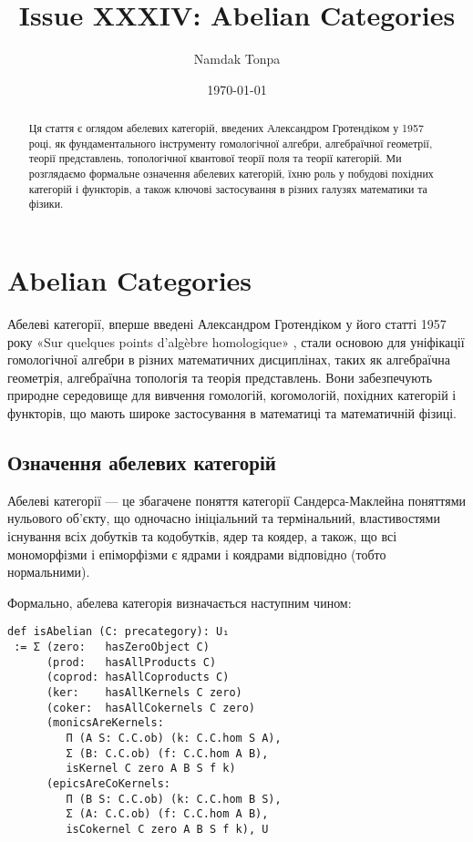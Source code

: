 \documentclass[12pt]{article}
\begin{document}
\title{Issue XXXIV: Abelian Categories}
\author{Namdak Tonpa}
\date{\today}

\maketitle

\begin{abstract}
Ця стаття є оглядом абелевих категорій, введених Александром Гротендіком у 1957 році, як фундаментального інструменту гомологічної алгебри, алгебраїчної геометрії, теорії представлень, топологічної квантової теорії поля та теорії категорій. Ми розглядаємо формальне означення абелевих категорій, їхню роль у побудові похідних категорій і функторів, а також ключові застосування в різних галузях математики та фізики.
\end{abstract}


\ifincludeTOC
  \tableofcontents
\fi

\section{Abelian Categories}
Абелеві категорії, вперше введені Александром Гротендіком у його статті 1957 року «Sur quelques points d'algèbre homologique» \cite{Grothendieck57}, стали основою для уніфікації гомологічної алгебри в різних математичних дисциплінах, таких як алгебраїчна геометрія, алгебраїчна топологія та теорія представлень. Вони забезпечують природне середовище для вивчення гомологій, когомологій, похідних категорій і функторів, що мають широке застосування в математиці та математичній фізиці.

\subsection{Означення абелевих категорій}
Абелеві категорії — це збагачене поняття категорії Сандерса-Маклейна поняттями нульового об’єкту, що одночасно ініціальний та термінальний, властивостями існування всіх добутків та кодобутків, ядер та коядер, а також, що всі мономорфізми і епіморфізми є ядрами і коядрами відповідно (тобто нормальними).

Формально, абелева категорія визначається наступним чином:

\begin{lstlisting}
def isAbelian (C: precategory): U₁
 := Σ (zero:   hasZeroObject C)
      (prod:   hasAllProducts C)
      (coprod: hasAllCoproducts C)
      (ker:    hasAllKernels C zero)
      (coker:  hasAllCokernels C zero)
      (monicsAreKernels:
         Π (A S: C.C.ob) (k: C.C.hom S A),
         Σ (B: C.C.ob) (f: C.C.hom A B),
         isKernel C zero A B S f k)
      (epicsAreCoKernels:
         Π (B S: C.C.ob) (k: C.C.hom B S),
         Σ (A: C.C.ob) (f: C.C.hom A B),
         isCokernel C zero A B S f k), U
\end{lstlisting}
\end{document}
